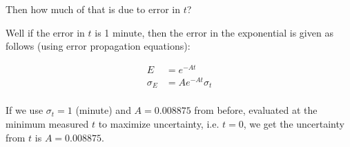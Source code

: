 Then how much of that is due to error in $t$?

Well if the error in $t$ is 1 minute, then the error in the exponential is given as follows (using error propagation equations):

\begin{align*}
    E &= e^{-At} \\
    \sigma_E &= Ae^{-At}\sigma_t \\
\end{align*}

If we use $\sigma_t = 1$ (minute) and $A=0.008875$ from before, evaluated at the minimum measured $t$ to maximize uncertainty, i.e. $t=0$, we get the uncertainty from $t$ is $A=0.008875$.

